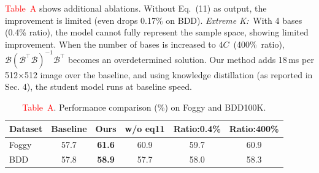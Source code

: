 \documentclass[10pt,twocolumn,letterpaper]{article}
\begin{document}
\textcolor{red}{Table~A}
shows additional ablations. 
Without Eq.~(11) as output, the improvement is limited (even drops 0.17\% on BDD). \textit{Extreme K:}~With 4 bases (0.4\% ratio), the model cannot fully represent the sample space, showing limited improvement.
When the number of bases is increased to $4C$~(400\%~ratio), 
$\mathcal{B} (\mathcal{B}^\top \mathcal{B})^{-1} \mathcal{B}^\top$ 
becomes an overdetermined solution. Our method adds 18\,ms per 512$\times$512 image over the baseline, and using knowledge distillation (as reported in Sec. 4), the student model runs at baseline speed.
\begin{table}[ht]
    \centering
    \scriptsize 
    \caption*{\textcolor{red}{Table~A}. Performance comparison (\%) on Foggy and BDD100K.}
       \vspace{-10pt}
    \begin{tabular}{lccccc}
    \toprule
    \textbf{Dataset} & \textbf{Baseline} & \textbf{Ours} & \textbf{w/o eq11} & \textbf{Ratio:0.4\%} & \textbf{Ratio:400\%} \\
    \midrule
    Foggy & 57.7 & \textbf{61.6} & 60.9 & 59.7 & 60.9 \\
    BDD   & 57.8 & \textbf{58.9} & 57.7 & 58.0 & 58.3 \\
    \bottomrule
    
    \end{tabular}
    \label{tab:ablation_study}
    \vspace{-6pt}
    \end{table}




\end{document}
